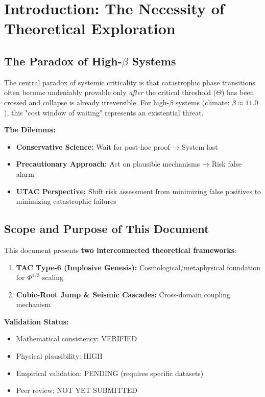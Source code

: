 \documentclass[11pt,a4paper]{article}
\begin{document}
\tableofcontents
\newpage

\section{Introduction: The Necessity of Theoretical Exploration}

\subsection{The Paradox of High-$\beta$ Systems}

The central paradox of systemic criticality is that catastrophic phase transitions often become undeniably provable only \textit{after} the critical threshold ($\Theta$) has been crossed and collapse is already irreversible. For high-$\beta$ systems (climate: $\bar{\beta} \approx 11.0$), this "cost window of waiting" represents an existential threat.

\textbf{The Dilemma:}
\begin{itemize}
\item \textbf{Conservative Science:} Wait for post-hoc proof → System lost
\item \textbf{Precautionary Approach:} Act on plausible mechanisms → Risk false alarm
\item \textbf{UTAC Perspective:} Shift risk assessment from minimizing false positives to minimizing catastrophic failures
\end{itemize}

\subsection{Scope and Purpose of This Document}

This document presents \textbf{two interconnected theoretical frameworks}:

\begin{enumerate}
\item \textbf{TAC Type-6 (Implosive Genesis):} Cosmological/metaphysical foundation for $\Phi^{1/3}$ scaling
\item \textbf{Cubic-Root Jump \& Seismic Cascades:} Cross-domain coupling mechanism
\end{enumerate}

\textbf{Validation Status:}
\begin{itemize}
\item[$\checkmark$] Mathematical consistency: VERIFIED
\item[$\checkmark$] Physical plausibility: HIGH
\item[$\times$] Empirical validation: PENDING (requires specific datasets)
\item[$\times$] Peer review: NOT YET SUBMITTED
\end{itemize}
\end{document}
